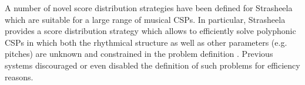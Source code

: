 \documentclass{scrartcl}
\begin{document}
A number of novel score distribution strategies have been defined for Strasheela which are suitable for a large range of musical CSPs. 
In particular, Strasheela provides a score distribution strategy which allows to efficiently solve polyphonic CSPs in which both the rhythmical structure as well as other parameters (e.g. pitches) are unknown and constrained in the problem definition \citep{Anders:ICMC:2002}. Previous systems discouraged or even disabled the definition of such problems for efficiency reasons.


%



\end{document}
